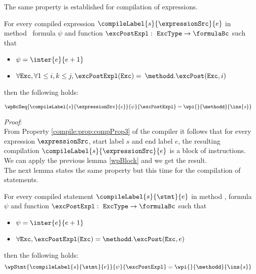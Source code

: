 The same property is established for compilation of expressions. 
\begin{relWpExpr}\label{relWpExpr}
     For every compiled expression $\compileLabel{s}{\expressionSrc}{e}$  in  method \methodd  \,  formula $\psi$ and function $\excPostExpl : \mbox{ \rm \texttt{ExcType}}  \rightarrow \formulaBc $ such that 

      \begin{itemize}
            \item $\psi = \inter{e}{e+1}$ 
	    \item $\forall \mbox{\rm\texttt{Exc}} ,  \forall 1 \le i,k \le j,  \excPostExpl( \mbox{\rm\texttt{Exc}} ) =$ 
                  $ \methodd.\excPost(\mbox{\rm\texttt{Exc}}, i ) $ 
            

      \end{itemize} then the following holds:

     $$   \wpBcSeq{\compileLabel{s}{\expressionSrc}{e}   }{\psi }{\excPostExpl} = \wpi{}{\methodd}{\ins{s}}$$        

\end{relWpExpr}

\textit{Proof}: \\
From Property \ref{compile:prop:compProp3} of the compiler it follows that for every expression
 $\expressionSrc$, start label $s$  and  end label $e$,
  the resulting compilation   $\compileLabel{s}{\expressionSrc}{e}$ is a block of instructions. We can apply 
 the previous lemma  \ref{wpBlock} and we get the result.
\Qed \\

The next lemma states the same property but this time for the compilation of statements.
\begin{relWpStmt}\label{relWpStmt}
     For every compiled statement $\compileLabel{s}{\stmt}{e}$  in  method \methodd, formula $\psi$ and 
    function $\excPostExpl : \mbox{ \rm \texttt{ExcType}}  \rightarrow \formulaBc $ such that 

      \begin{itemize}
            \item $\psi = \inter{e}{e+1}$
	    \item $\forall \mbox{\rm\texttt{Exc}} ,  \excPostExpl( \mbox{\rm\texttt{Exc}} ) = \methodd.\excPost(\mbox{\rm\texttt{Exc}}, e ) $ 
      \end{itemize} then the following holds: 
     $$   \wpStmt{\compileLabel{s}{\stmt}{e} }{\psi }{\excPostExpl} = \wpi{}{\methodd}{\ins{s}}$$   
\end{relWpStmt}


